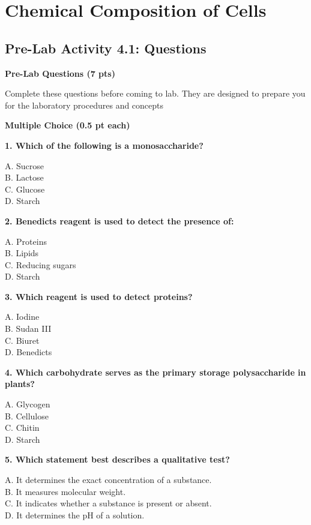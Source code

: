 \documentclass[
  letterpaper,
  DIV=11,
  numbers=noendperiod]{scrreprt}
\begin{document}

\chapter{\texorpdfstring{\textbf{Chemical Composition of
Cells}}{Chemical Composition of Cells}}\label{chemical-composition-of-cells}

\section{\texorpdfstring{\textbf{Pre-Lab Activity 4.1:
Questions}}{Pre-Lab Activity 4.1: Questions}}\label{pre-lab-activity-4.1-questions}

\textbf{Pre-Lab Questions (7 pts)}

Complete these questions before coming to lab. They are designed to
prepare you for the laboratory procedures and concepts

\textbf{Multiple Choice (0.5 pt each)}

\textbf{1. Which of the following is a monosaccharide?}

A. Sucrose\\
B. Lactose\\
C. Glucose\\
D. Starch

\textbf{2. Benedict\textquotesingle s reagent is used to detect the
presence of:}

A. Proteins\\
B. Lipids\\
C. Reducing sugars\\
D. Starch

\textbf{3. Which reagent is used to detect proteins?}

A. Iodine\\
B. Sudan III\\
C. Biuret\\
D. Benedict\textquotesingle s

\textbf{4. Which carbohydrate serves as the primary storage
polysaccharide in plants?}

A. Glycogen\\
B. Cellulose\\
C. Chitin\\
D. Starch

\textbf{5. Which statement best describes a qualitative test?}

A. It determines the exact concentration of a substance.\\
B. It measures molecular weight.\\
C. It indicates whether a substance is present or absent.\\
D. It determines the pH of a solution.
\end{document}
